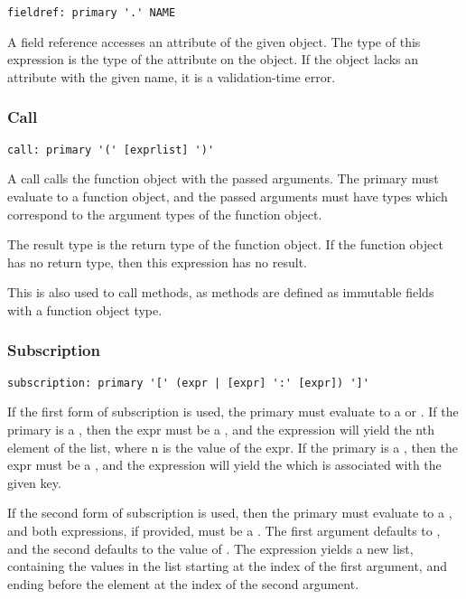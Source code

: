 \begin{lstlisting}
fieldref: primary '.' NAME
\end{lstlisting}

A field reference accesses an attribute of the given object. The type of this
expression is the type of the attribute on the object. If the object lacks
an attribute with the given name, it is a validation-time error.

\subsubsection{Call}
\label{sec:call}
\begin{lstlisting}
call: primary '(' [exprlist] ')'
\end{lstlisting}

A call calls the function object with the passed arguments. The primary must
evaluate to a function object, and the passed arguments must have types which
correspond to the argument types of the function object.

The result type is the return type of the function object. If the function
object has no return type, then this expression has no result.

This is also used to call methods, as methods are defined as immutable fields
with a function object type.

\subsubsection{Subscription}
\begin{lstlisting}
subscription: primary '[' (expr | [expr] ':' [expr]) ']'
\end{lstlisting}

If the first form of subscription is used, the primary must evaluate to a
\code{[T]} or . If the primary is a \code{[T]}, then the expr must
be a , and the expression will yield the nth element of the list,
where n is the value of the expr. If the primary is a , then the
expr must be a , and the expression will yield the  which is
associated with the given key.

If the second form of subscription is used, then the primary must evaluate to a
\code{[T]}, and both expressions, if provided, must be a . The first
argument defaults to , and the second defaults to the value of
. The expression yields a new list, containing the values in
the list starting at the index of the first argument, and ending before the
element at the index of the second argument.

